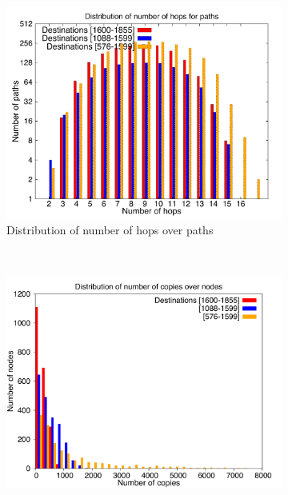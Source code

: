 \begin{figure}[!htbp]
        \centering
        \begin{subfigure}[b]{0.49\textwidth}
                \includegraphics[width=\textwidth]{report_figures/incrsize/2k/hop_histo.pdf}
                \caption{Distribution of number of hops over paths}
                \label{fig:incrsize_2k_hop}
        \end{subfigure}%
        ~ %
        \begin{subfigure}[b]{0.49\textwidth}
                \includegraphics[width=\textwidth]{report_figures/incrsize/2k/copy_histo.pdf}

\end{subfigure}
\end{figure}
